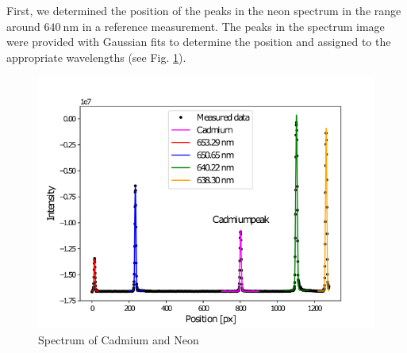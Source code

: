 First, we determined the position of the peaks in the neon spectrum in the range around $\SI{640}{\nano\meter}$ in a reference measurement.
The peaks in the spectrum image were provided with Gaussian fits to determine the position and assigned to the appropriate wavelengths (see Fig. \ref{fig:spectrum}).
\begin{figure}[ht]
\centering
\includegraphics[scale=.55]{images//spectrum.png}
\caption{Spectrum of Cadmium and Neon}
\label{fig:spectrum}
\end{figure}

